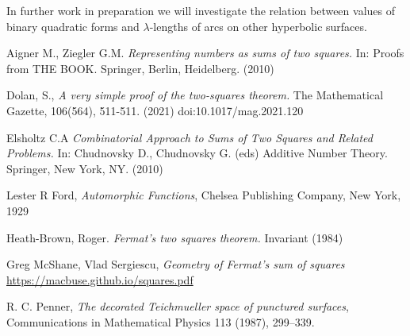 \documentclass[12pt]{amsart}
\theoremstyle{plain}
\theoremstyle{definition}
\begin{document}
In further work in preparation we will investigate the relation  between values of
binary quadratic forms and $\lambda$-lengths of arcs
on other hyperbolic surfaces.


Aigner M., Ziegler G.M.  
\textit{Representing numbers as sums of two squares.} In: Proofs from THE BOOK. Springer, Berlin, Heidelberg. (2010)


Dolan, S., 
\textit{A very simple proof of the two-squares theorem.}
The Mathematical Gazette, 106(564), 511-511. (2021) doi:10.1017/mag.2021.120
%
%


Elsholtz C.A 
\textit{Combinatorial Approach to Sums of Two Squares and Related Problems.}
 In: Chudnovsky D., Chudnovsky G. (eds) Additive Number Theory. Springer, New York, NY.
 (2010) 


Lester R Ford,
\textit{Automorphic Functions},
Chelsea Publishing Company, New York, 1929


%



Heath-Brown, Roger. 
\textit{ Fermat’s two squares theorem.} Invariant (1984) 




Greg McShane, Vlad Sergiescu,
\textit{Geometry of Fermat's sum of squares}
\url{https://macbuse.github.io/squares.pdf}

R. C. Penner, 
\textit{The decorated Teichmueller space of punctured surfaces}, 
Communications in Mathematical Physics 113 (1987), 299–339.
\end{document}
